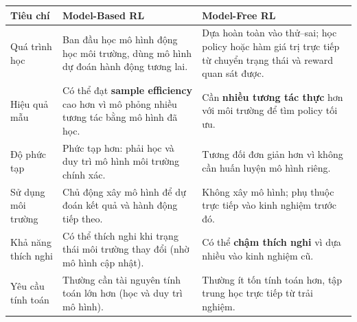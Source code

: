 \begin{tinhchat}[title={Bảng so sánh Model-Based RL và Model-Free RL}]
\begin{tabularx}{\linewidth}{>{\raggedright\arraybackslash}p{3.0cm}XX}
\textbf{Tiêu chí} & \textbf{Model-Based RL} & \textbf{Model-Free RL} \\
\midrule
Quá trình học &
Ban đầu học mô hình động học môi trường, dùng mô hình dự đoán hành động tương lai. &
Dựa hoàn toàn vào thử--sai; học policy hoặc hàm giá trị trực tiếp từ chuyển trạng thái và reward quan sát được. \\
Hiệu quả mẫu &
Có thể đạt \textbf{sample efficiency} cao hơn vì mô phỏng nhiều tương tác bằng mô hình đã học. &
Cần \textbf{nhiều tương tác thực} hơn với môi trường để tìm policy tối ưu. \\
Độ phức tạp &
Phức tạp hơn: phải học và duy trì mô hình môi trường chính xác. &
Tương đối đơn giản hơn vì không cần huấn luyện mô hình riêng. \\
Sử dụng môi trường &
Chủ động xây mô hình để dự đoán kết quả và hành động tiếp theo. &
Không xây mô hình; phụ thuộc trực tiếp vào kinh nghiệm trước đó. \\
Khả năng thích nghi &
Có thể thích nghi khi trạng thái môi trường thay đổi (nhờ mô hình cập nhật). &
Có thể \textbf{chậm thích nghi} vì dựa nhiều vào kinh nghiệm cũ. \\
Yêu cầu tính toán &
Thường cần tài nguyên tính toán lớn hơn (học và duy trì mô hình). &
Thường ít tốn tính toán hơn, tập trung học trực tiếp từ trải nghiệm. \\
\end{tabularx}
\end{tinhchat}
